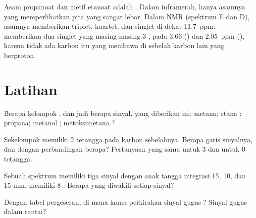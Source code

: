 \begin{example}\label{ex:g12:proton-nmr:isomers}
Asam propanoat  dan metil etanoat 
adalah . Dalam inframerah, hanya asamnya yang memperlihatkan pita
 yang sangat lebar. Dalam NMR (spektrum E dan D), asamnya
memberikan triplet, kuartet, dan singlet di dekat \qty{11.7}{ppm};
 memberikan dua singlet yang masing-masing 3 , pada 3.66
() dan \qty{2.05}{ppm} (), karena tidak ada 
karbon  itu yang membawa  di sebelah karbon lain yang
berproton.
\end{example}

\section{Latihan}

\begin{exercise}[$\star$]\label{exo:g12:proton-nmr:1}
Berapa kelompok , dan jadi berapa sinyal, yang
diberikan  ini: metana; etana ; propana;
metanol ; metoksimetana ?
\end{exercise}

\begin{exercise}[$\star$]\label{exo:g12:proton-nmr:2}
Sekelompok  memiliki 2  tetangga pada karbon sebelahnya.
Berapa garis sinyalnya, dan dengan perbandingan berapa? Pertanyaan yang
sama untuk 3 dan untuk 0 tetangga.
\end{exercise}

\begin{exercise}[$\star$]\label{exo:g12:proton-nmr:3}
Sebuah spektrum memiliki tiga sinyal dengan anak tangga integrasi 15,
10, dan 15 mm.  memiliki 8 . Berapa  yang
diwakili setiap sinyal?
\end{exercise}

\begin{exercise}[$\star$]\label{exo:g12:proton-nmr:4}
Dengan tabel pergeseran, di mana kamu perkirakan sinyal  gugus
? Sinyal gugus  dalam rantai?
\end{exercise}

